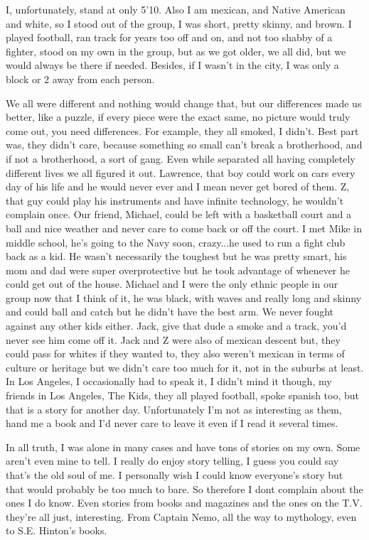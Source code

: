 I, unfortunately, stand at only 5’10. Also I am mexican, and Native American and white, so I stood out of the group, I was short, pretty skinny, and brown. I played football, ran track for years too off and on, and not too shabby of a fighter, stood on my own in the group, but as we got older, we all did, but we would always be there if needed. Besides, if I wasn’t in the city, I was only a block or 2 away from each person.

We all were different and nothing would change that, but our differences made us better, like a puzzle, if every piece were the exact same, no picture would truly come out, you need differences. For example, they all smoked, I didn’t. Best part was, they didn’t care, because something so small can't break a brotherhood, and if not a brotherhood, a sort of gang. Even while separated all having completely different lives we all figured it out. Lawrence, that boy could work on cars every day of his life and he would never ever and I mean never get bored of them. Z, that guy could play his instruments and have infinite technology, he wouldn’t complain once. Our friend, Michael, could be left with a basketball court and a ball and nice weather and never care to come back or off the court. I met Mike in middle school, he’s going to the Navy soon, crazy...he used to run a fight club back as a kid. He wasn’t necessarily the toughest but he was pretty smart, his mom and dad were super overprotective but he took advantage of whenever he could get out of the house. Michael and I were the only ethnic people in our group now that I think of it, he was black, with waves and really long and skinny and could ball and catch but he didn’t have the best arm. We never fought against any other kids either. Jack, give that dude a smoke and a track, you’d never see him come off it. Jack and Z were also of mexican descent but, they could pass for whites if they wanted to, they also weren’t mexican in terms of culture or heritage but we didn’t care too much for it, not in the suburbs at least. In Los Angeles, I occasionally had to speak it, I didn’t mind it though, my friends in Los Angeles, The Kids, they all played football, spoke spanish too, but that is a story for another day. Unfortunately I'm not as interesting as them, hand me a book and I’d never care to leave it even if I read it several times.

In all truth, I was alone in many cases and have tons of stories on my own. Some aren’t even mine to tell. I really do enjoy story telling, I guess you could say that's the old soul of me. I personally wish I could know everyone’s story but that would probably be too much to bare. So therefore I dont complain about the ones I do know. Even stories from books and magazines and the ones on the T.V. they’re all just, interesting. From Captain Nemo, all the way to mythology, even to S.E. Hinton’s books.

